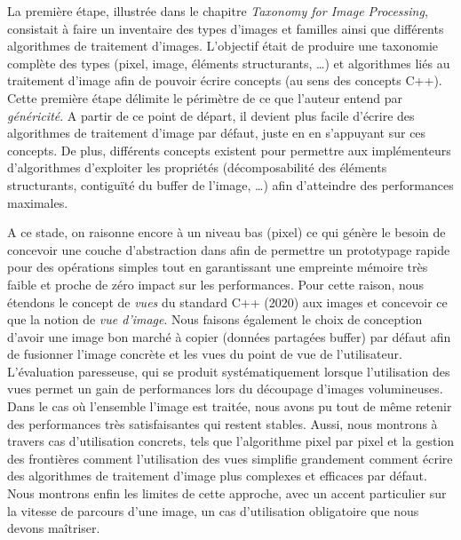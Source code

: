 La première étape, illustrée dans le chapitre \emph{Taxonomy for Image Processing}, consistait à faire un inventaire des
types d'images et familles ainsi que différents algorithmes de traitement d'images. L'objectif était de produire une
taxonomie complète des types (pixel, image, éléments structurants, \ldots) et algorithmes liés au traitement d'image
afin de pouvoir écrire concepts (au sens des concepts C++). Cette première étape délimite le périmètre de ce que
l'auteur entend par \emph{généricité}. A partir de ce point de départ, il devient plus facile d'écrire des algorithmes
de traitement d'image par défaut, juste en en s'appuyant sur ces concepts. De plus, différents concepts existent pour
permettre aux implémenteurs d'algorithmes d'exploiter les propriétés (décomposabilité des éléments structurants,
contiguïté du buffer de l'image, \ldots) afin d'atteindre des performances maximales.

A ce stade, on raisonne encore à un niveau bas (pixel) ce qui génère le besoin de concevoir une couche d'abstraction
dans afin de permettre un prototypage rapide pour des opérations simples tout en garantissant une empreinte mémoire très
faible et proche de zéro impact sur les performances. Pour cette raison, nous étendons le concept de \emph{vues} du
standard C++ (2020) aux images et concevoir ce que la notion de \emph{vue d'image}. Nous faisons également le choix de
conception d'avoir une image bon marché à copier (données partagées buffer) par défaut afin de fusionner l'image
concrète et les vues du point de vue de l'utilisateur. L'évaluation paresseuse, qui se produit systématiquement lorsque
l'utilisation des vues permet un gain de performances lors du découpage d'images volumineuses. Dans le cas où l'ensemble
l'image est traitée, nous avons pu tout de même retenir des performances très satisfaisantes qui restent stables. Aussi,
nous montrons à travers cas d'utilisation concrets, tels que l'algorithme pixel par pixel et la gestion des frontières
comment l'utilisation des vues simplifie grandement comment écrire des algorithmes de traitement d'image plus complexes
et efficaces par défaut. Nous montrons enfin les limites de cette approche, avec un accent particulier sur la vitesse de
parcours d'une image, un cas d'utilisation obligatoire que nous devons maîtriser.

